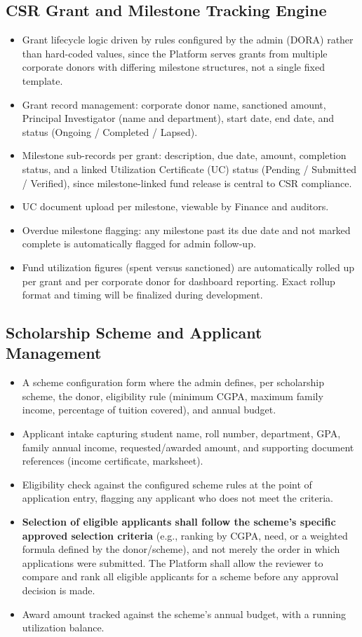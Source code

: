 \documentclass[11pt]{article}
\begin{document}
\subsection{CSR Grant and Milestone Tracking Engine}
\begin{itemize}[leftmargin=1.4em, itemsep=3pt]
\item Grant lifecycle logic driven by rules configured by the admin (DORA) rather than hard-coded values, since the Platform serves grants from multiple corporate donors with differing milestone structures, not a single fixed template.
\item Grant record management: corporate donor name, sanctioned amount, Principal Investigator (name and department), start date, end date, and status (Ongoing / Completed / Lapsed).
\item Milestone sub-records per grant: description, due date, amount, completion status, and a linked Utilization Certificate (UC) status (Pending / Submitted / Verified), since milestone-linked fund release is central to CSR compliance.
\item UC document upload per milestone, viewable by Finance and auditors.
\item Overdue milestone flagging: any milestone past its due date and not marked complete is automatically flagged for admin follow-up.
\item Fund utilization figures (spent versus sanctioned) are automatically rolled up per grant and per corporate donor for dashboard reporting. Exact rollup format and timing will be finalized during development.
\end{itemize}

\subsection{Scholarship Scheme and Applicant Management}
\begin{itemize}[leftmargin=1.4em, itemsep=3pt]
\item A scheme configuration form where the admin defines, per scholarship scheme, the donor, eligibility rule (minimum CGPA, maximum family income, percentage of tuition covered), and annual budget.
\item Applicant intake capturing student name, roll number, department, GPA, family annual income, requested/awarded amount, and supporting document references (income certificate, marksheet).
\item Eligibility check against the configured scheme rules at the point of application entry, flagging any applicant who does not meet the criteria.
\item \textbf{Selection of eligible applicants shall follow the scheme's specific approved selection criteria} (e.g., ranking by CGPA, need, or a weighted formula defined by the donor/scheme), and not merely the order in which applications were submitted. The Platform shall allow the reviewer to compare and rank all eligible applicants for a scheme before any approval decision is made.
\item Award amount tracked against the scheme's annual budget, with a running utilization balance.
\end{itemize}
\end{document}
